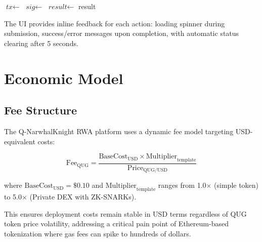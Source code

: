 \documentclass[11pt,a4paper,twoside]{article}
\begin{document}
\begin{algorithm}[H]
\caption{Contract Interaction Protocol}
\label{alg:interaction}
\begin{algorithmic}[1]
  \State $\textit{tx} \gets$ 
  \State $\textit{sig} \gets$  
  \State {}
  \State $\textit{result} \gets$  
  \State {} 
  \State \Return result
\EndProcedure
\end{algorithmic}
\end{algorithm}

The UI provides inline feedback for each action: loading spinner during submission, success/error messages upon completion, with automatic status clearing after 5 seconds.

\section{Economic Model}
\label{sec:economics}

\subsection{Fee Structure}

The Q-NarwhalKnight RWA platform uses a dynamic fee model targeting USD-equivalent costs:

\begin{equation}
\text{Fee}_{\text{QUG}} = \frac{\text{BaseCost}_{\text{USD}} \times \text{Multiplier}_{\text{template}}}{\text{Price}_{\text{QUG/USD}}}
\end{equation}

where $\text{BaseCost}_{\text{USD}} = \$0.10$ and $\text{Multiplier}_{\text{template}}$ ranges from 1.0$\times$ (simple token) to 5.0$\times$ (Private DEX with ZK-SNARKs).

This ensures deployment costs remain stable in USD terms regardless of QUG token price volatility, addressing a critical pain point of Ethereum-based tokenization where gas fees can spike to hundreds of dollars.
\end{document}
